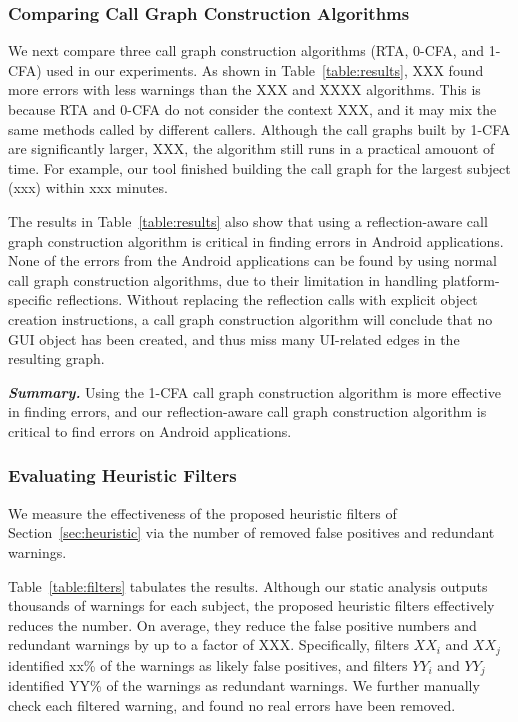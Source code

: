 \subsubsection{Comparing Call Graph Construction Algorithms}
\label{sec:reflectionaware}

We next compare three call graph construction algorithms (RTA, 0-CFA, and 1-CFA)
used in our experiments. As shown in Table~\ref{table:results},  XXX found
more errors with less warnings than the XXX and XXXX algorithms. This
is because RTA and 0-CFA do not consider the context XXX, and it may
mix the same methods called by different callers. Although the call graphs
built by 1-CFA are significantly larger, XXX, the algorithm still runs
in a practical amouont of time. For example,
our tool finished building the call graph for the largest subject (xxx)
within xxx minutes.

The results in Table~\ref{table:results} also show that using a reflection-aware
call graph construction algorithm is critical in finding errors in Android
applications. None of the errors from the Android applications
can be found by using normal call graph construction algorithms, due to
their limitation in handling platform-specific reflections. Without
replacing the reflection calls with explicit object creation instructions,
a call graph construction algorithm will
conclude that no GUI object has been created, and thus miss many UI-related
edges in the resulting graph.

\vspace{1mm}

\noindent \textbf{\textit{Summary.}} Using the 1-CFA call graph construction
algorithm is more effective in finding errors, and our reflection-aware call
graph construction algorithm is critical to find errors on
Android applications.

\subsubsection{Evaluating Heuristic Filters}
\label{sec:filters}

We measure the effectiveness of the proposed heuristic filters of
Section~\ref{sec:heuristic} via the number of removed false positives and
redundant warnings.

Table~\ref{table:filters} tabulates the results. Although
our static analysis outputs thousands of warnings for each
subject, the proposed heuristic filters effectively reduces
the number. On average, they
 reduce the false positive numbers and redundant warnings by up to a factor of
XXX. Specifically, filters $XX_i$ and $XX_j$  identified xx\% of
the warnings as likely false positives, and filters $YY_i$
and $YY_j$ identified YY\% of the warnings as redundant warnings.
We further manually check each filtered warning, and found no
real errors have been removed.

